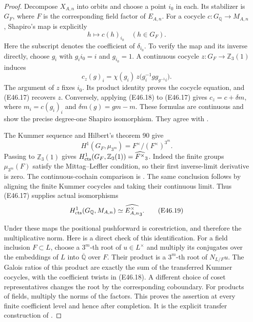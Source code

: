 \begin{proof}
Decompose $X_{A,n}$ into orbits and choose a point
$i_0$ in each. Its stabilizer is $G_{F}$, where $F$
is the corresponding field factor of $E_{A,n}$.
For a cocycle $c:G_{\mathbb Q}\to M_{A,n}$, Shapiro's
map is explicitly
\[
                     h\longmapsto c(h)_{i_0}
                       \quad(h\in G_F).              \tag{E46.17}
\]
Here the subscript denotes the coefficient of
$\delta_{i_0}$. To verify the map and its inverse
directly, choose $g_i$ with $g_i i_0=i$ and
$g_{i_0}=1$. A continuous cocycle
$z:G_F\to\mathbb Z_3(1)$ induces
\[
 c_z(g)_i=
  \chi(g_i)\,
  z\bigl(g_i^{-1}g g_{g^{-1}i}\bigr).                 \tag{E46.18}
\]
The argument of $z$ fixes $i_0$. Its product identity
proves the cocycle equation, and (E46.17) recovers
$z$. Conversely, applying (E46.18) to (E46.17)
gives $c_z=c+\delta m$, where
$m_i=c(g_i)_i$ and $\delta m(g)=g m-m$.
These formulas are continuous
and show the precise degree-one Shapiro isomorphism.
They agree with \cite[II, Proposition1.11 and
Example1.27(a)]{E_MilneCFT}.

The Kummer sequence and Hilbert's theorem 90
\cite[II, Proposition1.22 and its proof]{E_MilneCFT} give
\[
 H^1(G_F,\mu_{3^m})=F^\times/(F^\times)^{3^m}.
\]
Passing to $\mathbb Z_3(1)$ gives
$H^1_{\rm cts}(G_F,\mathbb Z_3(1))=
\widehat{F^\times}_3$. Indeed the finite groups
$\mu_{3^m}(F)$ satisfy the Mittag--Leffler condition,
so their first inverse-limit derivative is zero.
The continuous-cochain comparison is
\cite[Proposition1.6 and Theorem2.2]{E_JannsenContinuous}.
The same conclusion follows by aligning the finite
Kummer cocycles and taking their continuous limit.
Thus (E46.17) supplies actual isomorphisms
\[
       H^1_{\rm cts}(G_{\mathbb Q},M_{A,n})
                       \simeq\widehat{E_{A,n}^\times}_3.
 \tag{E46.19}
\]

Under these maps the positional pushforward is
corestriction, and therefore the multiplicative
norm. Here is a direct check of this identification.
For a field inclusion $F\subset L$, choose a
$3^m$-th root of $u\in L^\times$ and multiply its
conjugates over the embeddings of $L$ into
$\overline{\mathbb Q}$ over $F$. Their product is
a $3^m$-th root of $N_{L/F}u$. The Galois ratios of
this product are exactly the sum of the transferred
Kummer cocycles, with the coefficient twists in
(E46.18). A different choice of coset representatives
changes the root by the corresponding coboundary.
For products of fields, multiply the norms of the
factors. This proves the assertion at every finite
coefficient level and hence after completion.
It is the explicit transfer construction of
\cite[II, Example1.29]{E_MilneCFT}.


\end{proof}
